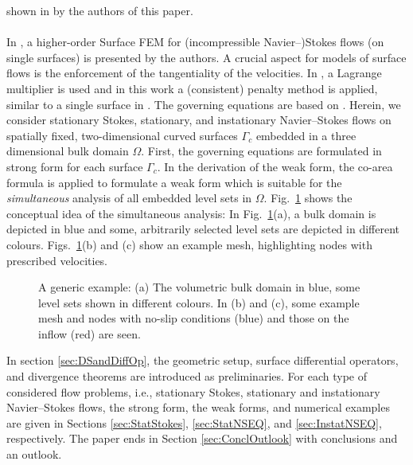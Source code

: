 \documentclass[12pt, twoside, english]{article}
\numberwithin{equation}{section}
\begin{document}
shown in \cite{Fries_2024a} by the authors of this paper.\\
\\
In \cite{Fries_2018a}, a higher-order Surface FEM for (incompressible Navier--)Stokes flows (on single surfaces) is presented by the authors. A crucial aspect for models of surface flows is the enforcement of the tangentiality of the velocities. In \cite{Fries_2018a}, a Lagrange multiplier is used and in this work a (consistent) penalty method is applied, similar to a single surface in \cite{Jankuhn_2018a,Jankuhn_2019a,Olshanskii_2019a}. The governing equations are based on \cite{Jankuhn_2018a}. Herein, we consider stationary Stokes, stationary, and instationary Navier--Stokes flows on spatially fixed, two-dimensional curved surfaces $\Gamma_{\!c}$ embedded in a three dimensional bulk domain $\Omega$. First, the governing equations are formulated in strong form for each surface $\Gamma_{\!c}$. In the derivation of the weak form, the co-area formula is applied to formulate a weak form which is suitable for the \emph{simultaneous} analysis of all embedded level sets in $\Omega$. Fig.~\ref{fig:GenExamp} shows the conceptual idea of the simultaneous analysis: In Fig.~\ref{fig:GenExamp}(a), a bulk domain is depicted in blue and some, arbitrarily selected level sets are depicted in different colours. Figs.~\ref{fig:GenExamp}(b) and (c) show an example mesh, highlighting nodes with prescribed velocities.

\begin{figure}
	\centering
	
	\hfil
	\hfill
	
	\caption{\label{fig:GenExamp} A generic example: (a) The volumetric bulk domain in blue, some level sets shown in different colours. In (b) and (c), some example mesh and nodes with no-slip conditions (blue) and those on the inflow (red) are seen.}
\end{figure}

In section \ref{sec:DSandDiffOp}, the geometric setup, surface differential operators, and divergence theorems are introduced as preliminaries. For each type of considered flow problems, i.e., stationary Stokes, stationary and instationary Navier--Stokes flows, the strong form, the weak forms, and numerical examples are given in Sections \ref{sec:StatStokes}, \ref{sec:StatNSEQ}, and \ref{sec:InstatNSEQ}, respectively. The paper ends in Section \ref{sec:ConclOutlook} with conclusions and an outlook.
\end{document}
